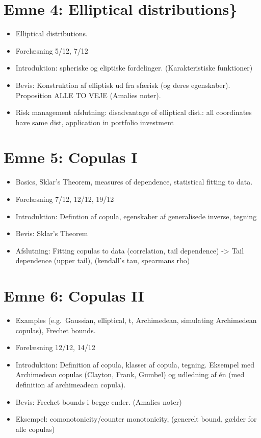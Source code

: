 \documentclass[a4paper,12pt,openany]{book}
\providecommand{\tightlist}{%
 \setlength{\itemsep}{0pt}\setlength{\parskip}{0pt}}
\begin{document}
\hypertarget{emne-4-elliptical-distributions}{%
\section{Emne 4: Elliptical distributions\}}\label{emne-4-elliptical-distributions}}

\begin{itemize}
\tightlist
\item
  Elliptical distributions.
\item
  Forelæsning 5/12, 7/12
\item
  Introduktion: spheriske og eliptiske fordelinger. (Karakteristiske funktioner)
\item
  Bevis: Konstruktion af elliptisk ud fra sfærisk (og deres egenskaber). Proposition ALLE TO VEJE (Amalies noter).
\item
  Risk management afslutning: disadvantage of elliptical dist.: all coordinates have same dist, application in portfolio investment
\end{itemize}

\hypertarget{emne-5-copulas-i}{%
\section{Emne 5: Copulas I}\label{emne-5-copulas-i}}

\begin{itemize}
\tightlist
\item
  Basics, Sklar's Theorem, measures of dependence, statistical fitting to data.
\item
  Forelæsning 7/12, 12/12, 19/12
\item
  Introduktion: Defintion af copula, egenskaber af generalisede inverse, tegning
\item
  Bevis: Sklar's Theorem
\item
  Afslutning: Fitting copulas to data (correlation, tail dependence) -\textgreater{} Tail dependence (upper tail), (kendall's tau, spearmans rho)
\end{itemize}

\hypertarget{emne-6-copulas-ii}{%
\section{Emne 6: Copulas II}\label{emne-6-copulas-ii}}

\begin{itemize}
\tightlist
\item
  Examples (e.g.~Gaussian, elliptical, t, Archimedean, simulating Archimedean copulas), Frechet bounds.
\item
  Forelæsning 12/12, 14/12
\item
  Introduktion: Definition af copula, klasser af copula, tegning. Eksempel med Archimedean copulas (Clayton, Frank, Gumbel) og udledning af én (med definition af archimeadean copula).
\item
  Bevis: Frechet bounds i begge ender. (Amalies noter)
\item
  Eksempel: comonotonicity/counter monotonicity, (generelt bound, gælder for alle copulas)
\end{itemize}
\end{document}
